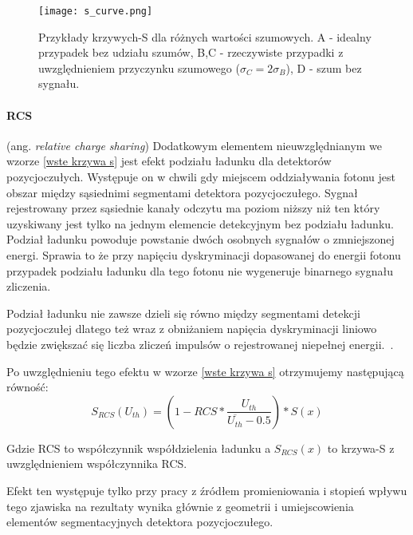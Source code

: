 \begin{figure}[h]
        \centering
        \texttt{[image: s\_curve.png]}
        \caption{Przykłady krzywych-S dla różnych wartości szumowych. A - idealny przypadek bez udziału szumów, B,C - rzeczywiste przypadki z uwzględnieniem przyczynku szumowego ($\sigma_C=2\sigma_B$), D - szum bez sygnału. \cite{wiocek doctorat}} 
        \label{wyk s curve wstep}
\end{figure}

\paragraph{RCS}
(ang. \textit{relative charge sharing})
Dodatkowym elementem nieuwzględnianym we wzorze \ref{wste krzywa s} jest efekt podziału ładunku dla detektorów pozycjoczułych. Występuje on w chwili gdy miejscem oddziaływania fotonu jest obszar między sąsiednimi segmentami detektora pozycjoczułego. Sygnał rejestrowany przez sąsiednie kanały odczytu ma poziom niższy niż ten który uzyskiwany jest tylko na jednym elemencie detekcyjnym bez podziału ładunku.
Podział ładunku powoduje powstanie dwóch osobnych sygnałów o zmniejszonej energi. Sprawia to że przy napięciu dyskryminacji dopasowanej do energii fotonu przypadek podziału ładunku dla tego fotonu nie wygeneruje binarnego sygnału zliczenia. 

Podział ładunku nie zawsze dzieli się równo między segmentami detekcji pozycjoczułej dlatego też wraz z obniżaniem napięcia dyskryminacji liniowo będzie zwiększać się liczba zliczeń impulsów o rejestrowanej niepełnej energii.~\cite{Monika mag}. 

Po uwzględnieniu tego efektu w wzorze \ref{wste krzywa s} otrzymujemy następującą równość:
\begin{equation}
        \label{wstep rcs}
        S_{RCS}(U_{th}) = (1-RCS * \frac{U_{th}}{\overline{U_{th}} - 0.5}) * S(x)
\end{equation}

Gdzie RCS to współczynnik współdzielenia ładunku a $S_{RCS}(x)$ to krzywa-S z uwzględnieniem współczynnika RCS.

Efekt ten występuje tylko przy pracy z źródłem promieniowania i stopień wpływu tego zjawiska na rezultaty wynika głównie z geometrii i umiejscowienia elementów segmentacyjnych detektora pozycjoczułego.

